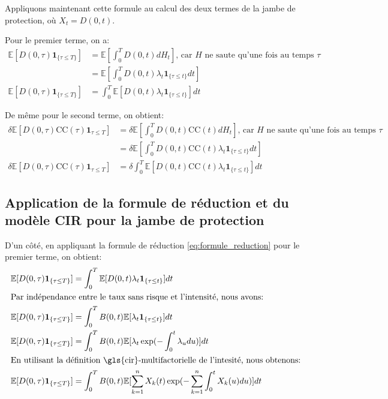 Appliquons maintenant cette formule au calcul des deux termes de la jambe de protection, où $X_t = D(0, t)$.

Pour le premier terme, on a:
\begin{align*}
    \mathbb{E}[D(0, \tau) \mathbf{1}_{\{\tau \le T\}}] &= \mathbb{E}[\int_0^T D(0, t)dH_t] \text{, car $H$ ne saute qu'une fois au temps $\tau$} \\
    &= \mathbb{E}[\int_0^T D(0, t) \lambda_t \mathbf{1}_{\{\tau \le t\}} dt] \\
    \mathbb{E}[D(0, \tau) \mathbf{1}_{\{\tau \le T\}}] &= \int_0^T \mathbb{E}[D(0, t) \lambda_t \mathbf{1}_{\{\tau \le t\}}]dt
\end{align*}

De même pour le second terme, on obtient:
\begin{align*}
    \delta \mathbb{E}[D(0, \tau) \mathrm{CC}(\tau) \mathbf{1}_{\tau \le T}] &= \delta \mathbb{E}[\int_0^T D(0, t) \mathrm{CC}(t) dH_t] \text{, car $H$ ne saute qu'une fois au temps $\tau$} \\
    &= \delta \mathbb{E}[\int_0^T D(0, t) \mathrm{CC}(t)  \lambda_t \mathbf{1}_{\{\tau \le t\}} dt] \\
    \delta \mathbb{E}[D(0, \tau) \mathrm{CC}(\tau) \mathbf{1}_{\tau \le T}] &= \delta \int_0^T \mathbb{E}[D(0, t) \mathrm{CC}(t)  \lambda_t \mathbf{1}_{\{\tau \le t\}}] dt
\end{align*}


\subsection{Application de la formule de réduction et du modèle CIR pour la jambe de protection}

D'un côté, en appliquant la formule de réduction \ref{eq:formule_reduction} pour le premier terme, on obtient:
\begin{align*}
    \mathbb{E}[D(0, \tau) \mathbf{1}_{\{\tau \le T\}}] &= \int_0^T \mathbb{E}[D(0, t) \lambda_t \mathbf{1}_{\{\tau \le t\}}]dt \\
    \intertext{Par indépendance entre le taux sans risque et l'intensité, nous avons:}
    \mathbb{E}[D(0, \tau) \mathbf{1}_{\{\tau \le T\}}] &= \int_0^T B(0, t) \mathbb{E}[\lambda_t \mathbf{1}_{\{\tau \le t\}}]dt \\
    \mathbb{E}[D(0, \tau) \mathbf{1}_{\{\tau \le T\}}] &= \int_0^T B(0, t) \mathbb{E}[\lambda_t \exp(-\int_0^t \lambda_u du)]dt \\
    \intertext{En utilisant la définition \gls{cir}-multifactorielle de l'intesité, nous obtenons:}
    \mathbb{E}[D(0, \tau) \mathbf{1}_{\{\tau \le T\}}] &= \int_0^T B(0, t) \mathbb{E}[\sum_{k=1}^n X_k(t) \exp(-\sum_{k = 1}^n \int_0^t X_k(u) du)]dt
\end{align*}

